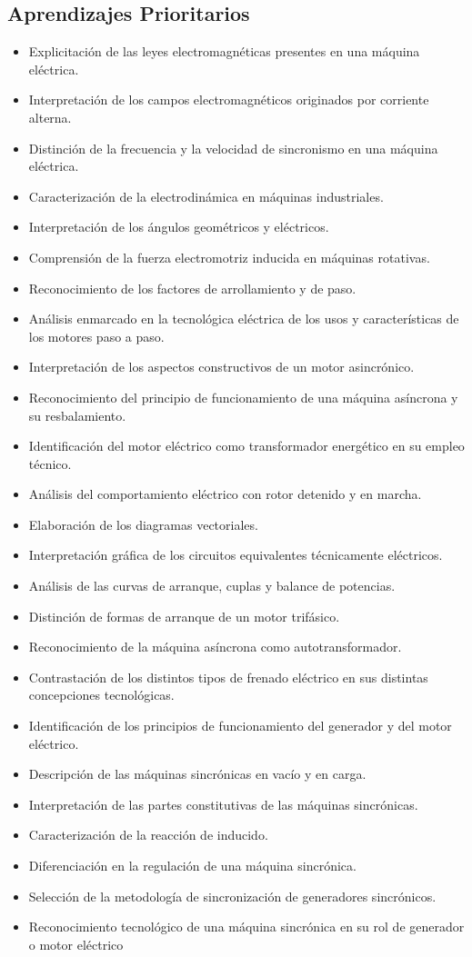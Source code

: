 \documentclass[../main]{subfiles}
\begin{document}
\subsection*{Aprendizajes Prioritarios}
\begin{itemize}
  \item Explicitación de las leyes electromagnéticas presentes en una
    máquina eléctrica.
  \item Interpretación de los campos electromagnéticos originados por
    corriente alterna.
  \item Distinción de la frecuencia y la velocidad de sincronismo en
    una máquina eléctrica.
  \item Caracterización de la electrodinámica en máquinas industriales.
  \item Interpretación de los ángulos geométricos y eléctricos.
  \item Comprensión de la fuerza electromotriz inducida en máquinas rotativas.
  \item Reconocimiento de los factores de arrollamiento y de paso.
  \item Análisis enmarcado en la tecnológica eléctrica de los usos y
    características de los motores paso a paso.
  \item Interpretación de los aspectos constructivos de un motor asincrónico.
  \item Reconocimiento del principio de funcionamiento de una máquina asíncrona
    y su resbalamiento.
  \item Identificación del motor eléctrico como transformador
    energético en su empleo técnico.
  \item Análisis del comportamiento eléctrico con rotor detenido y en marcha.
  \item Elaboración de los diagramas vectoriales.
  \item Interpretación gráfica de los circuitos equivalentes
    técnicamente eléctricos.
  \item Análisis de las curvas de arranque, cuplas y balance de potencias.
  \item Distinción de formas de arranque de un motor trifásico.
  \item Reconocimiento de la máquina asíncrona como autotransformador.
  \item Contrastación de los distintos tipos de frenado eléctrico en sus
    distintas concepciones tecnológicas.
  \item Identificación de los principios de funcionamiento del generador
    y del motor eléctrico.
  \item Descripción de las máquinas sincrónicas en vacío y en carga.
  \item Interpretación de las partes constitutivas de las máquinas sincrónicas.
  \item Caracterización de la reacción de inducido.
  \item Diferenciación en la regulación de una máquina sincrónica.
  \item Selección de la metodología de sincronización de generadores
    sincrónicos.
  \item Reconocimiento tecnológico de una máquina sincrónica en su rol
    de generador o motor eléctrico
\end{itemize}
\tableofcontents
\end{document}
